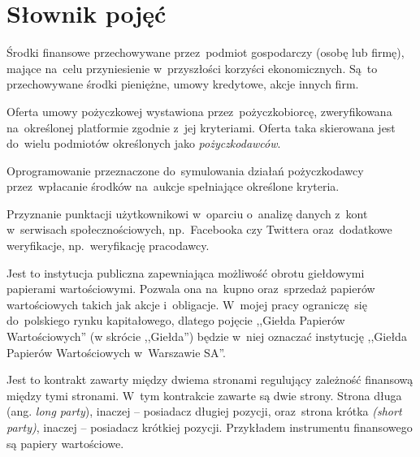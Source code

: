 \documentclass[a4paper,twoside,titlepage,openright]{book}
\begin{document}
\chapter*{Słownik pojęć}
\begin{description}[style=nextline]
	\item[Aktywa finansowe] Środki finansowe przechowywane przez~podmiot gospodarczy (osobę lub firmę), mające na~celu przyniesienie w~przyszłości korzyści ekonomicznych. Są~to przechowywane środki pieniężne, umowy kredytowe, akcje innych firm.
	\item[Aukcja pożyczkowa] Oferta umowy pożyczkowej wystawiona przez~pożyczkobiorcę, zweryfikowana na~określonej platformie zgodnie z~jej kryteriami. Oferta taka skierowana jest do~wielu podmiotów określonych jako \textit{pożyczkodawców}.
	\item[Automat inwestycyjny] Oprogramowanie przeznaczone do~symulowania działań pożyczkodawcy przez~wpłacanie środków na~aukcje spełniające określone kryteria.
	\item[FriendlyScore] Przyznanie punktacji użytkownikowi w~oparciu o~analizę danych z~kont w~serwisach społecznościowych, np.~Facebooka czy Twittera oraz~dodatkowe weryfikacje, np.~weryfikację pracodawcy.
	\item[Giełda Papierów Wartościowych] Jest to instytucja publiczna zapewniająca możliwość obrotu giełdowymi papierami wartościowymi. Pozwala ona na~kupno oraz~sprzedaż papierów wartościowych takich jak akcje i~obligacje. W~mojej pracy ograniczę~się do~polskiego rynku kapitałowego, dlatego pojęcie ,,Giełda Papierów Wartościowych'' (w skrócie ,,Giełda'') będzie w~niej oznaczać instytucję ,,Giełda Papierów Wartościowych w~Warszawie SA''.\cite{gielda}
	\item[Instrument finansowy (ang. \textit{financial instrument})]  Jest to kontrakt zawarty między dwiema stronami regulujący zależność finansową między tymi stronami. W~tym kontrakcie zawarte są dwie strony. Strona długa (ang. \textit{long party}), inaczej -- posiadacz długiej pozycji, oraz~strona krótka \textit{(short party)}, inaczej -- posiadacz krótkiej pozycji. Przykładem instrumentu finansowego są papiery wartościowe. \cite{inwestycje}

\end{description}
\end{document}
